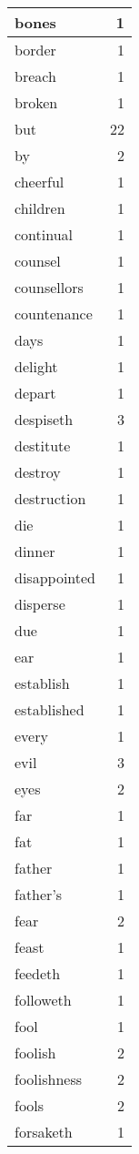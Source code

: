 \begin{center}
\begin{longtable}{l|r}
bones & 1\\ \hline 
border & 1\\ \hline 
breach & 1\\ \hline 
broken & 1\\ \hline 
but & 22\\ \hline 
by & 2\\ \hline 
cheerful & 1\\ \hline 
children & 1\\ \hline 
continual & 1\\ \hline 
counsel & 1\\ \hline 
counsellors & 1\\ \hline 
countenance & 1\\ \hline 
days & 1\\ \hline 
delight & 1\\ \hline 
depart & 1\\ \hline 
despiseth & 3\\ \hline 
destitute & 1\\ \hline 
destroy & 1\\ \hline 
destruction & 1\\ \hline 
die & 1\\ \hline 
dinner & 1\\ \hline 
disappointed & 1\\ \hline 
disperse & 1\\ \hline 
due & 1\\ \hline 
ear & 1\\ \hline 
establish & 1\\ \hline 
established & 1\\ \hline 
every & 1\\ \hline 
evil & 3\\ \hline 
eyes & 2\\ \hline 
far & 1\\ \hline 
fat & 1\\ \hline 
father & 1\\ \hline 
father's & 1\\ \hline 
fear & 2\\ \hline 
feast & 1\\ \hline 
feedeth & 1\\ \hline 
followeth & 1\\ \hline 
fool & 1\\ \hline 
foolish & 2\\ \hline 
foolishness & 2\\ \hline 
fools & 2\\ \hline 
forsaketh & 1\\ \hline 

\end{longtable}
\end{center}
